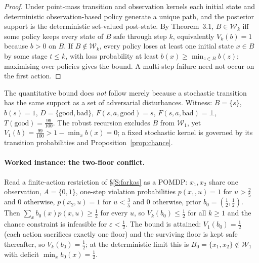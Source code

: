 \documentclass[11pt,a4paper]{article}
\theoremstyle{plain}
\theoremstyle{definition}
\theoremstyle{remark}
\newcommand{\cW}{\mathcal{W}}
\begin{document}
\begin{proof}
Under point-mass transition and observation kernels each initial state and deterministic observation-based policy generate a unique path, and the posterior support is the deterministic set-valued post-state. By Theorem~3.1, $B\in\cW_k$ iff some policy keeps every state of $B$ safe through step $k$, equivalently $V_k(b)=1$ because $b>0$ on $B$. If $B\notin\cW_k$, every policy loses at least one initial state $x\in B$ by some stage $t\le k$, with loss probability at least $b(x)\ge\min_{z\in B}b(z)$; maximising over policies gives the bound. A multi-step failure need not occur on the first action.
\end{proof}

The quantitative bound does \emph{not} follow merely because a stochastic transition has the same support as a set of adversarial disturbances. Witness: $B=\{s\}$, $b(s)=1$, $D=\{\text{good},\text{bad}\}$, $F(s,a,\text{good})=s$, $F(s,a,\text{bad})=\bot$, $T(\text{good})=\tfrac{99}{100}$. The robust recursion excludes $B$ from $\cW_1$, yet $V_1(b)=\tfrac{99}{100}>1-\min_xb(x)=0$; a fixed stochastic kernel is governed by its transition probabilities and Proposition~\ref{prop:chance}.

\paragraph{Worked instance: the two-floor conflict.} Read a finite-action restriction of \S\ref{S:farkas} as a POMDP: $x_1,x_2$ share one observation, $A=\{0,1\}$, one-step violation probabilities $p(x_1,u)=1$ for $u>\tfrac25$ and $0$ otherwise, $p(x_2,u)=1$ for $u<\tfrac35$ and $0$ otherwise, prior $b_0=(\tfrac12,\tfrac12)$. Then $\sum_xb_0(x)p(x,u)\ge\tfrac12$ for every $u$, so $V_k(b_0)\le\tfrac12$ for all $k\ge1$ and the chance constraint is infeasible for $\varepsilon<\tfrac12$. The bound is attained: $V_1(b_0)=\tfrac12$ (each action sacrifices exactly one floor) and the surviving floor is kept safe thereafter, so $V_k(b_0)=\tfrac12$; at the deterministic limit this is $B_0=\{x_1,x_2\}\notin\cW_1$ with deficit $\min_xb_0(x)=\tfrac12$.
\end{document}

